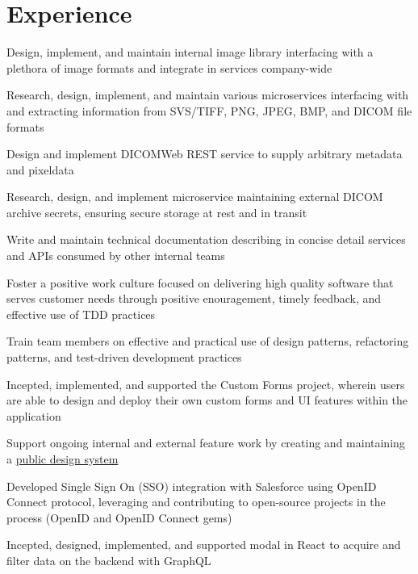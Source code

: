 \documentclass[]{deedy-resume-openfont}
\begin{document}
\hfill
\begin{minipage}[t]{0.66\textwidth} 


\section{Experience}

\vspace{\topsep}
\begin{tightemize}
    \item Design, implement, and maintain internal image library interfacing with a plethora of image formats and integrate in services company-wide
    \item Research, design, implement, and maintain various microservices interfacing with and extracting information from SVS/TIFF, PNG, JPEG, BMP, and DICOM file formats
    \item Design and implement DICOMWeb REST service to supply arbitrary metadata and pixeldata
    \item Research, design, and implement microservice maintaining external DICOM archive secrets, ensuring secure storage at rest and in transit
    \item Write and maintain technical documentation describing in concise detail services and APIs consumed by other internal teams
    \item Foster a positive work culture focused on delivering high quality software that serves customer needs through positive enouragement, timely feedback, and effective use of TDD practices
    \item Train team members on effective and practical use of design patterns, refactoring patterns, and test-driven development practices
\end{tightemize}
\sectionsep

\vspace{\topsep}
\begin{tightemize}
    \item Incepted, implemented, and supported the Custom Forms project, wherein users are able to design and deploy their own custom forms and UI features within the application
    \item Support ongoing internal and external feature work by creating and maintaining a \href{https://mavenlink.github.io/design-system/master}{public design system}
    \item Developed Single Sign On (SSO) integration with Salesforce using OpenID Connect protocol, leveraging and contributing to open-source projects in the process (OpenID and OpenID Connect gems)
    \item Incepted, designed, implemented, and supported modal in React to acquire and filter data on the backend with GraphQL
\end{tightemize}
\sectionsep


\end{minipage}
\end{document}
